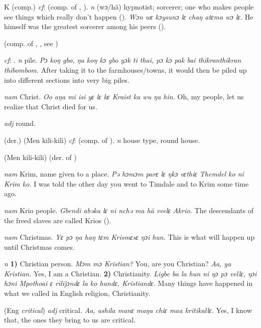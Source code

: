 \begin{letter}{K}
 (comp.) \textit{cf}:  (comp. of , ). \textit{n} (wɔ/hã) hypnotist; sorcerer; one who makes people see things which really don't happen (\citealt{Pichl1967}). \textit{Wɔn wɛ kɔysunɔ lɛ chaŋ atɛma wɔ lɛ.} He himself was the greatest sorcerer among his peers (\citealt{Pichl1967}).

 (comp. of , , see ) 

 \textit{cf}: . \textit{n} pile. \textit{Pɔ koŋ gbo, ŋa koŋ kɔ gbo yɔk ti thai, pɔ kɔ pak bai thikranthikran thibombom.} After taking it to the farmhouses/towns, it would then be piled up into different sections into very big piles.

 \textit{nam} Christ. \textit{Oo aŋa mi isi yɛ lɛ kɛ Kraist ka wu ŋa hin.} Oh, my people, let us realize that Christ died for us.

 \textit{adj} round.

 (der.) (Men kili-kili) \textit{cf}:  (comp. of ). \textit{n} house type, round house.

 (Men kili-kili) (der. of ) 

 \textit{nam} Krim, name given to a place. \textit{Pə hɔmɔm parɛ lɛ ŋkɔ vɛthiɛ Themdel ko ni Krim ko.} I was told the other day you went to Timdale and to Krim some time ago.

 \textit{nam} Krio people. \textit{Gbendi abəka lɛ ni nchə ma hã veelɛ Akrio.} The descendants of the freed slaves are called Krios (\citealt{Pichl1967}).

 \textit{nam} Christmas. \textit{Yɛ pɔ ŋa haŋ tɛm Krismɛsɛ ŋɔi hun.} This is what will happen up until Christmas comes.

 \textit{n} \textbf{1)} Christian person. \textit{Mɔm mɔ Kristian?} You, are you Christian? \textit{Aa, ya Kristian.} Yes, I am a Christian. \textbf{2)} Christianity. \textit{Ligbe ba la hun ni ŋɔ pɔ vellɛ, ŋɔi hɔni Mpothoai ɛ rilijɔndɛ la ko hundɛ, Kristiandɛ.} Many things have happened in what we called in English religion, Christianity.

 (Eng \textit{critical}) \textit{adj} critical. \textit{Aa, ashila manɛ maŋa chiɛ maa kritikallɛ.} Yes, I know that, the ones they bring to us are critical.


\end{letter}
